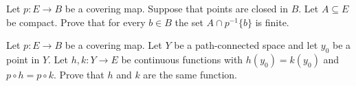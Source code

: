 \begin{problem}
  Let $p\colon E\to B$ be a covering map. Suppose that points are closed in
  $B$. Let $A\subseteq E$ be compact. Prove that for every $b\in B$ the set
  $A\cap p^{-1}\{b\}$ is finite.
\end{problem}
\begin{solution}
\end{solution}

\begin{problem}
  Let $p\colon E\to B$ be a covering map. Let $Y$ be a path-connected space
  and let $y_0$ be a point in $Y$. Let $h,k\colon Y\to E$ be continuous
  functions with $h(y_0)=k(y_0)$ and $p\circ h=p\circ k$. Prove that $h$
  and $k$ are the same function.
\end{problem}
\begin{solution}
\end{solution}


